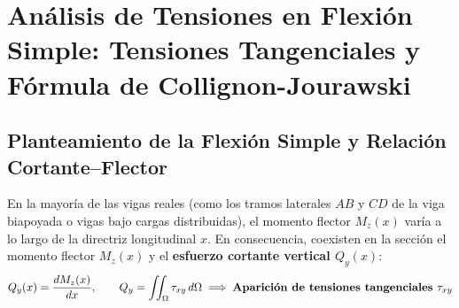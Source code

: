 \section{Análisis de Tensiones en Flexión Simple: Tensiones Tangenciales y Fórmula de Collignon-Jourawski}

\subsection{Planteamiento de la Flexión Simple y Relación Cortante--Flector}

En la mayoría de las vigas reales (como los tramos laterales $AB$ y $CD$ de la viga biapoyada o vigas bajo cargas distribuidas), el momento flector $M_z(x)$ varía a lo largo de la directriz longitudinal $x$. En consecuencia, coexisten en la sección el momento flector $M_z(x)$ y el \textbf{esfuerzo cortante vertical $Q_y(x)$}:
\begin{equation}
    Q_y(x) = \frac{dM_z(x)}{dx}, \qquad Q_y = \iint_{\Omega} \tau_{xy} \, d\Omega \implies \text{\textbf{Aparición de tensiones tangenciales }}\tau_{xy}
\end{equation}

